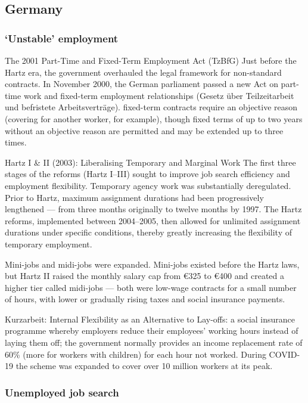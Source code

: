 \documentclass[12pt]{article}
\theoremstyle{definition}
\theoremstyle{remark}
\begin{document}
\subsection{Germany}
\subsubsection{`Unstable' employment}
The 2001 Part-Time and Fixed-Term Employment Act (TzBfG)
Just before the Hartz era, the government overhauled the legal framework for non-standard contracts. In November 2000, the German parliament passed a new Act on part-time work and fixed-term employment relationships (Gesetz über Teilzeitarbeit und befristete Arbeitsverträge). fixed-term contracts require an objective reason (covering for another worker, for example), though fixed terms of up to two years without an objective reason are permitted and may be extended up to three times.  

Hartz I \& II (2003): Liberalising Temporary and Marginal Work
The first three stages of the reforms (Hartz I–III) sought to improve job search efficiency and employment flexibility.
Temporary agency work was substantially deregulated. Prior to Hartz, maximum assignment durations had been progressively lengthened — from three months originally to twelve months by 1997. The Hartz reforms, implemented between 2004–2005, then allowed for unlimited assignment durations under specific conditions, thereby greatly increasing the flexibility of temporary employment. 

Mini-jobs and midi-jobs were expanded. Mini-jobs existed before the Hartz laws, but Hartz II raised the monthly salary cap from €325 to €400 and created a higher tier called midi-jobs — both were low-wage contracts for a small number of hours, with lower or gradually rising taxes and social insurance payments. 

Kurzarbeit: Internal Flexibility as an Alternative to Lay-offs: a social insurance programme whereby employers reduce their employees' working hours instead of laying them off; the government normally provides an income replacement rate of 60\% (more for workers with children) for each hour not worked. During COVID-19 the scheme was expanded to cover over 10 million workers at its peak. 

\subsubsection{Unemployed job search}
\end{document}
